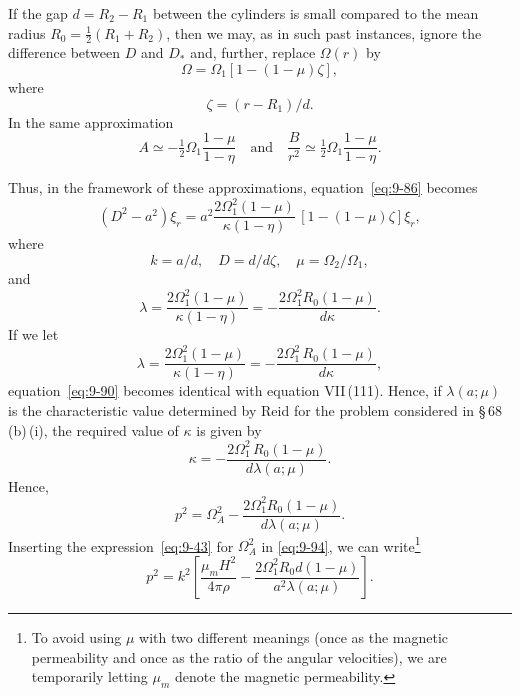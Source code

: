 If the gap $d = R_2 - R_1$ between the cylinders is small compared to the mean radius $R_0 = \frac{1}{2}(R_1 + R_2)$, then we may, as in such past instances, ignore the difference between $D$ and $D_*$ and, further, replace $\Omega(r)$ by
\begin{equation}
\Omega = \Omega_1[1 - (1 - \mu)\zeta], \label{eq:9-87}
\end{equation}
where
\begin{equation}
\zeta = (r - R_1)/d. \label{eq:9-88}
\end{equation}
In the same approximation
\begin{equation}
A \simeq -\tfrac{1}{2}\Omega_1 \frac{1-\mu}{1-\eta} \quad \text{and} \quad \frac{B}{r^2} \simeq \tfrac{1}{2}\Omega_1 \frac{1-\mu}{1-\eta}. \label{eq:9-89}
\end{equation}

Thus, in the framework of these approximations, equation~\eqref{eq:9-86} becomes
\begin{equation}
(D^2 - a^2)\xi_r = a^2 \frac{2\Omega_1^2(1-\mu)}{\kappa(1-\eta)}\,[1 - (1 - \mu)\zeta]\xi_r, \label{eq:9-90}
\end{equation}
where
\begin{equation}
k = a/d, \quad D = d/d\zeta, \quad \mu = \Omega_2/\Omega_1, \label{eq:9-91}
\end{equation}
and
\begin{equation}
\lambda = \frac{2\Omega_1^2(1-\mu)}{\kappa(1-\eta)} = -\frac{2\Omega_1^2 R_0(1-\mu)}{d\kappa}. \label{eq:9-92}
\end{equation}
If we let
\begin{equation}
\lambda = \frac{2\Omega_1^2(1-\mu)}{\kappa(1-\eta)} = -\frac{2\Omega_1^2\, R_0(1-\mu)}{d\kappa}, \label{eq:9-92a}
\end{equation}
equation~\eqref{eq:9-90} becomes identical with equation VII\,(111). Hence, if $\lambda(a; \mu)$ is the characteristic value determined by Reid for the problem considered in \S\,68\,(b)\,(i), the required value of $\kappa$ is given by
\begin{equation}
\kappa = -\frac{2\Omega_1^2\, R_0(1-\mu)}{d\lambda(a;\mu)}. \label{eq:9-93}
\end{equation}
Hence,
\begin{equation}
p^2 = \Omega_A^2 - \frac{2\Omega_1^2 R_0(1-\mu)}{d\lambda(a;\mu)}. \label{eq:9-94}
\end{equation}
Inserting the expression~\eqref{eq:9-43} for $\Omega_A^2$ in \eqref{eq:9-94}, we can write\footnote{To avoid using $\mu$ with two different meanings (once as the magnetic permeability and once as the ratio of the angular velocities), we are temporarily letting $\mu_m$ denote the magnetic permeability.}
\begin{equation}
p^2 = k^2 \left[\frac{\mu_m H^2}{4\pi\rho} - \frac{2\Omega_1^2 R_0 d(1-\mu)}{a^2 \lambda(a;\mu)}\right]. \label{eq:9-95}
\end{equation}

